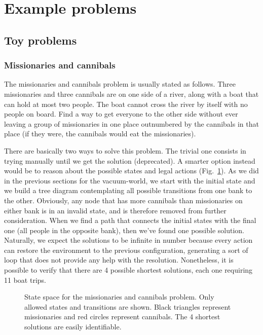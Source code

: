 \section{Example problems}
\subsection{Toy problems}
\subsubsection{Missionaries and cannibals}
The missionaries and cannibals problem is usually stated as follows. Three missionaries and three cannibals are on one side of a river, along with a boat that can hold at most two people. The boat cannot cross the river by itself with no people on board. Find a way to get everyone to the other side without ever leaving a group of missionaries in one place outnumbered by the cannibals in that place (if they were, the cannibals would eat the missionaries).

There are basically two ways to solve this problem. The trivial one consists in trying manually until we get the solution (deprecated). A smarter option instead would be to reason about the possible states and legal actions (Fig.~\ref{MissionariesCannibals}). As we did in the previous sections for the vacuum-world, we start with the initial state and we build a tree diagram contemplating all possible transitions from one bank to the other. Obviously, any node that has more cannibals than missionaries on either bank is in an invalid state, and is therefore removed from further consideration. When we find a path that connects the initial states with the final one (all people in the opposite bank), then we've found one possible solution. Naturally, we expect the solutions to be infinite in number because every action can restore the environment to the previous configuration, generating a sort of loop that does not provide any help with the resolution. Nonetheless, it is possible to verify that there are 4 possible shortest solutions, each one requiring 11 boat trips.
\begin{figure}[ht]
\centering
{}
\resizebox{\textwidth}{!}{}
\caption{State space for the missionaries and cannibals problem. Only allowed states and transitions are shown. Black triangles represent missionaries and red circles represent cannibals. The 4 shortest solutions are easily identifiable.}\label{MissionariesCannibals}
\end{figure}

